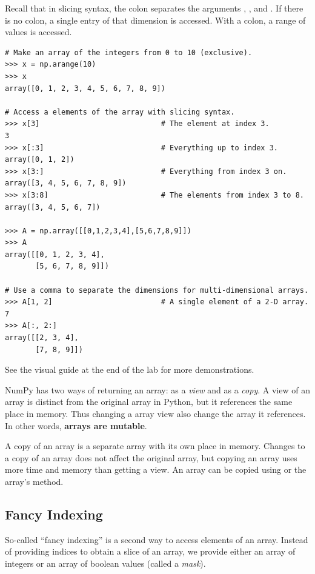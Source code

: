Recall that in slicing syntax, the colon \li{:} separates the arguments , , and .
If there is no colon, a single entry of that dimension is accessed.
With a colon, a range of values is accessed.

\begin{lstlisting}
# Make an array of the integers from 0 to 10 (exclusive).
>>> x = np.arange(10)
>>> x
array([0, 1, 2, 3, 4, 5, 6, 7, 8, 9])

# Access a elements of the array with slicing syntax.
>>> x[3]                            # The element at index 3.
3
>>> x[:3]                           # Everything up to index 3.
array([0, 1, 2])
>>> x[3:]                           # Everything from index 3 on.
array([3, 4, 5, 6, 7, 8, 9])
>>> x[3:8]                          # The elements from index 3 to 8.
array([3, 4, 5, 6, 7])

>>> A = np.array([[0,1,2,3,4],[5,6,7,8,9]])
>>> A
array([[0, 1, 2, 3, 4],
       [5, 6, 7, 8, 9]])

# Use a comma to separate the dimensions for multi-dimensional arrays.
>>> A[1, 2]                         # A single element of a 2-D array.
7
>>> A[:, 2:]
array([[2, 3, 4],
       [7, 8, 9]])
\end{lstlisting}

See the visual guide at the end of the lab for more demonstrations.

\begin{info} %
NumPy has two ways of returning an array: as a \emph{view} and as a \emph{copy}.
A view of an array is distinct from the original array in Python, but it references the same place in memory. 
Thus changing a array view also change the array it references.
In other words, \textbf{arrays are mutable}.

A copy of an array is a separate array with its own place in memory. 
Changes to a copy of an array does not affect the original array, but copying an array uses more time and memory than getting a view.
An array can be copied using  or the array's  method.
\end{info}

\subsection*{Fancy Indexing} %

So-called ``fancy indexing'' is a second way to access elements of an array.
Instead of providing indices to obtain a slice of an array, we provide either an array of integers or an array of boolean values (called a \emph{mask}).

